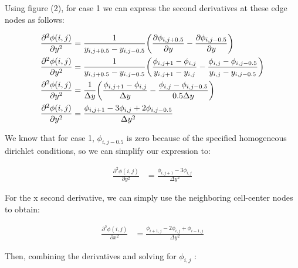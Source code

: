 \documentclass{article}
\begin{document}
\vspace{1em}

\noindent Using figure (2), for case 1 we can express the second derivatives  at these edge nodes as follows:

\begin{align}
\frac{\partial^2 \phi (i,j)}{\partial y^2}  &=  \frac{1}{{y_{i, j+0.5} - y_{i, j-0.5}}}  \bigg( \frac{\partial \phi_{i, j+0.5}}{\partial y} - \frac{\partial \phi_{i, j-0.5}}{\partial y} \bigg)    \nonumber   \\
\frac{\partial^2 \phi (i,j)}{\partial y^2}  &= \frac{1}{{y_{i, j+0.5} - y_{i, j-0.5}}}  \bigg(  \frac{ \phi_{i,j+1} - \phi_{i,j} }{y_{i,j+1} - y_{i,j}}  -  \frac{ \phi_{i,j} - \phi_{i,j-0.5} }{y_{i,j} - y_{i,j-0.5}}   \bigg) \nonumber  \vspace{1 em}  \\
\frac{\partial^2 \phi (i,j)}{\partial y^2}  &= \frac{1}{\Delta y}  \bigg(  \frac{ \phi_{i,j+1} - \phi_{i,j} }{\Delta y}  -  \frac{ \phi_{i,j} - \phi_{i,j-0.5} }{0.5 \Delta y}   \bigg) \nonumber \vspace{1 em}  \\
\frac{\partial^2 \phi (i,j)}{\partial y^2}  &= \frac{  \phi_{i,j+1} - 3 \phi_{i,j} + 2 \phi_{i,j-0.5} }{\Delta y^{2}} \nonumber
\end{align}

\vspace{1em}

\noindent We know that for case 1, $\phi_{i,j-0.5} $ is zero because of the specified homogeneous dirichlet conditions, so we can simplify our expression to:

\begin{align}
\frac{\partial^2 \phi (i,j)}{\partial y^2}  &= \frac{  \phi_{i,j+1} - 3 \phi_{i,j}  }{\Delta y^{2}} \nonumber
\end{align}

\vspace{1em}

\noindent For the x second derivative, we can simply use the neighboring cell-center nodes to obtain:

\begin{align}
\frac{\partial^2 \phi (i,j)}{\partial x^2}  &= \frac{  \phi_{i+1,j} - 2 \phi_{i,j} +  \phi_{i-1,j} }{\Delta y^{2}} \nonumber
\end{align}

\vspace{1em}

\noindent Then, combining the derivatives and solving for $\phi_{i,j}$ :
\end{document}
